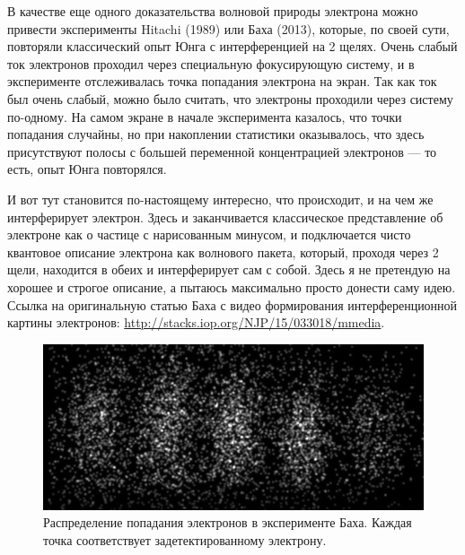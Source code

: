 \documentclass[12pt]{article}
\begin{document}
\vspace{1em} \noindent
В качестве еще одного доказательства волновой природы электрона можно привести эксперименты Hitachi (1989) или Баха (2013),  которые, по своей сути, повторяли классический опыт Юнга с интерференцией на 2 щелях. Очень слабый ток электронов проходил через специальную фокусирующую систему, и в эксперименте отслеживалась точка попадания электрона на экран. Так как ток был очень слабый, можно было считать, что электроны проходили через систему по-одному. На самом экране в начале эксперимента казалось, что точки попадания случайны, но при накоплении статистики оказывалось, что здесь присутствуют полосы с большей переменной концентрацией электронов --- то есть, опыт Юнга повторялся. 

\vspace{1em} \noindent
И вот тут становится по-настоящему интересно, что происходит, и на чем же интерферирует электрон. Здесь и заканчивается классическое представление об электроне как о частице с нарисованным минусом, и подключается чисто квантовое описание электрона как волнового пакета, который, проходя через 2 щели, находится в обеих и интерферирует сам с собой. Здесь я не претендую на хорошее и строгое описание, а пытаюсь максимально просто донести саму идею. Ссылка на оригинальную статью Баха с видео формирования интерференционной картины электронов: \url{http://stacks.iop.org/NJP/15/033018/mmedia}.
\begin{figure}[h]
    \centering
    \includegraphics[width=\textwidth,height=\textheight,keepaspectratio]{Seminar_03/pics/pic_01.png}
    \caption{Распределение попадания электронов в эксперименте Баха. Каждая точка соответствует задетектированному электрону.}
    \label{fig:sem_03_bach_experiment}
\end{figure}
\end{document}
